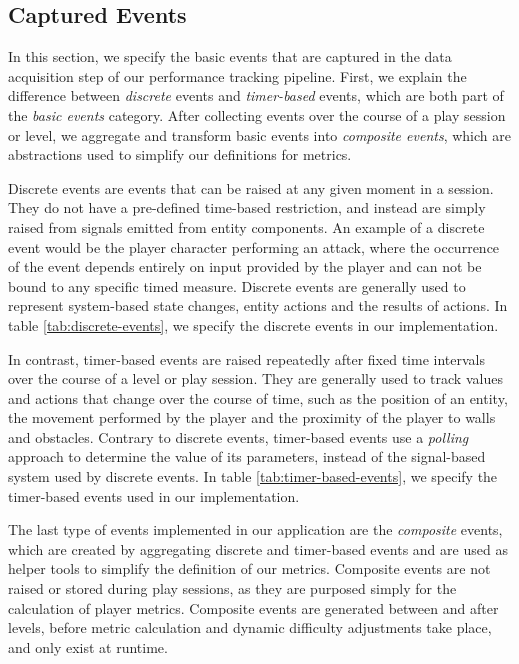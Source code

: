 \subsection{Captured Events}

In this section, we specify the basic events that are captured in the data acquisition step of our performance tracking pipeline. First, we explain the difference between \emph{discrete} events and \emph{timer-based} events, which are both part of the \emph{basic events} category. After collecting events over the course of a play session or level, we aggregate and transform basic events into \emph{composite events}, which are abstractions used to simplify our definitions for metrics.


Discrete events are events that can be raised at any given moment in a session. They do not have a pre-defined time-based restriction, and instead are simply raised from signals emitted from entity components. An example of a discrete event would be the player character performing an attack, where the occurrence of the event depends entirely on input provided by the player and can not be bound to any specific timed measure. Discrete events are generally used to represent system-based state changes, entity actions and the results of actions. In table \ref{tab:discrete-events}, we specify the discrete events in our implementation.



In contrast, timer-based events are raised repeatedly after fixed time intervals over the course of a level or play session. They are generally used to track values and actions that change over the course of time, such as the position of an entity, the movement performed by the player and the proximity of the player to walls and obstacles. Contrary to discrete events, timer-based events use a \emph{polling} approach to determine the value of its parameters, instead of the signal-based system used by discrete events. In table \ref{tab:timer-based-events}, we specify the timer-based events used in our implementation.



The last type of events implemented in our application are the \emph{composite} events, which are created by aggregating discrete and timer-based events and are used as helper tools to simplify the definition of our metrics. Composite events are not raised or stored during play sessions, as they are purposed simply for the calculation of player metrics. Composite events are generated between and after levels, before metric calculation and dynamic difficulty adjustments take place, and only exist at runtime.

